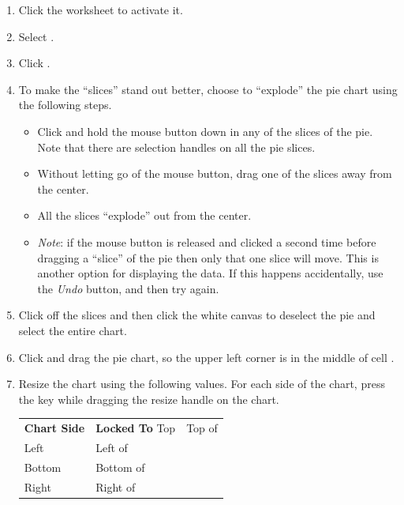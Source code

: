 \begin{enumbox}
	\begin{enumerate}
		\item Click the  worksheet to activate it.
		\item Select .
		\item Click .
		\item To make the ``slices'' stand out better, choose to ``explode'' the pie chart using the following steps.
	
		\begin{itemize}
			\item Click and hold the mouse button down in any of the slices of the pie. Note that there are selection handles on all the pie slices.
			\item Without letting go of the mouse button, drag one of the slices away from the center.
			\item All the slices ``explode'' out from the center.
			\item \textit{Note}: if the mouse button is released and clicked a second time before dragging a ``slice'' of the pie then only that one slice will move. This is another option for displaying the data. If this happens accidentally, use the \textit{Undo} button, and then try again.
		\end{itemize}
	
		\item Click off the slices and then click the white canvas to deselect the pie and select the entire chart.
		\item Click and drag the pie chart, so the upper left corner is in the middle of cell .
		\item Resize the chart using the following values. For each side of the chart, press the  key while dragging the resize handle on the chart.
	
		\begin{table}[H]
		\captionsetup{labelformat=empty} %
		{\small
			\begin{longtable}{R{0.75in}L{1.50in}} %
				\textbf{Chart Side} & \textbf{Locked To} \endhead
				\hline
				Top & Top of \\
				Left & Left of \\
				Bottom & Bottom of \\
				Right & Right of \\
			\end{longtable}
		} %
		\end{table}
	

\end{enumerate}
\end{enumbox}
